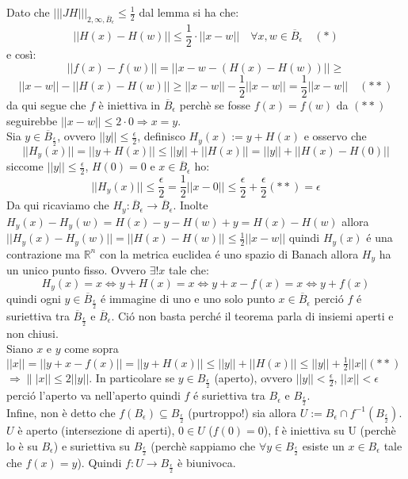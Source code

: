 \documentclass[a4paper,11pt,titlepage]{book}
\begin{document}
Dato che $|||JH|||_{2,\infty,\overline{B}_\epsilon}\leq\frac{1}{2}$ dal lemma si ha che: $$||H(x)-H(w)||\leq\frac{1}{2}\cdot||x-w||\quad \forall x,w\in\overline{B}_\epsilon \quad (*)$$ e così: $$||f(x)-f(w)||=||x-w-(H(x)-H(w))||\geq$$ $$||x-w||-||H(x)-H(w)||\geq||x-w||-\frac{1}{2}||x-w||=\frac{1}{2}||x-w||\quad (**)$$ da qui segue che $f$ è iniettiva in  $\overline{B}_\epsilon$ perchè se fosse $f(x)=f(w)$ da $(**)$ seguirebbe $||x-w||\leq 2\cdot 0\Rightarrow x=y$.\\

Sia $y\in \overline{B}_\frac{\epsilon}{2}$, ovvero $||y||\leq\frac{\epsilon}{2}$, definisco $H_y(x):=y+H(x)$ e osservo che $$||H_y(x)||=||y+H(x)||\leq||y||+||H(x)||=||y||+||H(x)-H(0)||$$ siccome $||y||\leq\frac{\epsilon}{2}$, $H(0)=0$ e $x\in\overline{B}_\epsilon$ ho: $$||H_y(x)||\leq\frac{\epsilon}{2}=\frac{1}{2}||x-0||\leq \frac{\epsilon}{2}+\frac{\epsilon}{2}(**)=\epsilon$$ Da qui ricaviamo che $H_y:\overline{B}_\epsilon\to\overline{B}_\epsilon$. Inolte $H_y(x)-H_y(w)=H(x)-y-H(w)+y=H(x)-H(w)$ allora $||H_y(x)-H_y(w)||=||H(x)-H(w)||\leq\frac{1}{2}||x-w||$ quindi $H_y(x)$ é una contrazione ma $\mathbb{R}^n$ con la metrica euclidea é uno spazio di Banach allora $H_y$ ha un unico punto fisso. Ovvero $\exists!x$ tale che: $$H_y(x)=x\Leftrightarrow y+H(x)=x \Leftrightarrow y+x-f(x)=x\Leftrightarrow y+f(x)$$ quindi ogni $y\in\overline{B}_\frac{\epsilon}{2}$ é immagine di uno e uno solo punto $x\in\overline{B}_\epsilon$ perció $f$ é suriettiva tra $\overline{B}_\frac{\epsilon}{2}$ e $\overline{B}_\epsilon$. Ció non basta perché il teorema parla di insiemi aperti e non chiusi.\\

Siano $x$ e $y$ come sopra $||x||=||y+x-f(x)||=||y+H(x)||\leq||y||+||H(x)||\leq||y||+\frac{1}{2}||x||(**)$ $\Rightarrow\||x||\leq2||y||$. In particolare se $y\in B_\frac{\epsilon}{2}$ (aperto), ovvero $||y||<\frac{\epsilon}{2}$, $||x||<\epsilon$ perció l'aperto va nell'aperto quindi $f$ é suriettiva tra $B_\epsilon$ e $B_\frac{\epsilon}{2}$.\\

Infine, non è detto che $f(B_\epsilon)\subseteq B_{\frac{\epsilon}{2}}$ (purtroppo!) sia allora $U:=B_\epsilon\cap f^{-1}(B_{\frac{\epsilon}{2}})$. $U$ è aperto (intersezione di aperti), $0\in U$ ($f(0)=0$), f è iniettiva su U (perchè lo è su $B_\epsilon$) e suriettiva su $B_{\frac{\epsilon}{2}}$ (perchè sappiamo che $\forall y\in B_{\frac{\epsilon}{2}}$ esiste un $x\in B_\epsilon$ tale che $f(x)=y$). Quindi $f:U\to B_{\frac{\epsilon}{2}}$ è biunivoca.\\
\end{document}
